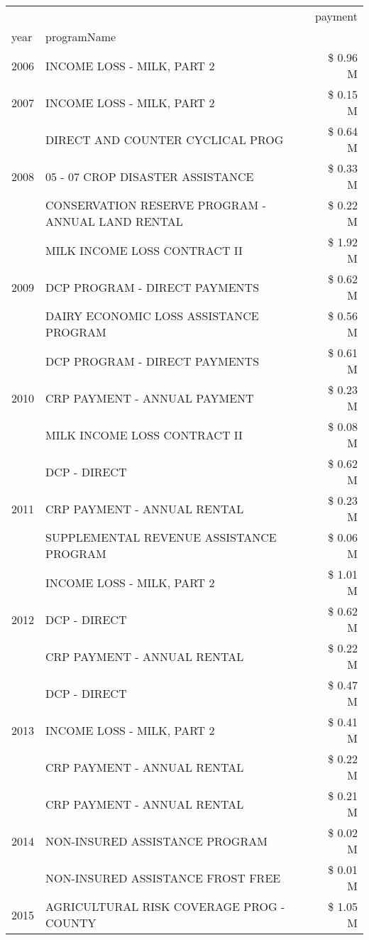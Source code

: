 \begin{tabular}{llr}
\toprule
 &  & payment \\
year & programName &  \\
\midrule
2006 & INCOME LOSS - MILK, PART 2 & \$ 0.96 M \\
\cline{1-3}
2007 & INCOME LOSS - MILK, PART 2 & \$ 0.15 M \\
\cline{1-3}
\multirow[t]{3}{*}{2008} & DIRECT AND COUNTER CYCLICAL PROG & \$ 0.64 M \\
 & 05 - 07 CROP DISASTER ASSISTANCE & \$ 0.33 M \\
 & CONSERVATION RESERVE PROGRAM - ANNUAL LAND RENTAL & \$ 0.22 M \\
\cline{1-3}
\multirow[t]{3}{*}{2009} & MILK INCOME LOSS CONTRACT II & \$ 1.92 M \\
 & DCP PROGRAM - DIRECT PAYMENTS & \$ 0.62 M \\
 & DAIRY ECONOMIC LOSS ASSISTANCE PROGRAM & \$ 0.56 M \\
\cline{1-3}
\multirow[t]{3}{*}{2010} & DCP PROGRAM - DIRECT PAYMENTS & \$ 0.61 M \\
 & CRP PAYMENT - ANNUAL PAYMENT & \$ 0.23 M \\
 & MILK INCOME LOSS CONTRACT II & \$ 0.08 M \\
\cline{1-3}
\multirow[t]{3}{*}{2011} & DCP - DIRECT & \$ 0.62 M \\
 & CRP PAYMENT - ANNUAL RENTAL & \$ 0.23 M \\
 & SUPPLEMENTAL REVENUE ASSISTANCE PROGRAM & \$ 0.06 M \\
\cline{1-3}
\multirow[t]{3}{*}{2012} & INCOME LOSS - MILK, PART 2 & \$ 1.01 M \\
 & DCP - DIRECT & \$ 0.62 M \\
 & CRP PAYMENT - ANNUAL RENTAL & \$ 0.22 M \\
\cline{1-3}
\multirow[t]{3}{*}{2013} & DCP - DIRECT & \$ 0.47 M \\
 & INCOME LOSS - MILK, PART 2 & \$ 0.41 M \\
 & CRP PAYMENT - ANNUAL RENTAL & \$ 0.22 M \\
\cline{1-3}
\multirow[t]{3}{*}{2014} & CRP PAYMENT - ANNUAL RENTAL & \$ 0.21 M \\
 & NON-INSURED ASSISTANCE PROGRAM & \$ 0.02 M \\
 & NON-INSURED ASSISTANCE FROST FREE & \$ 0.01 M \\
\cline{1-3}
\multirow[t]{2}{*}{2015} & AGRICULTURAL RISK COVERAGE PROG - COUNTY & \$ 1.05 M \\

\end{tabular}
